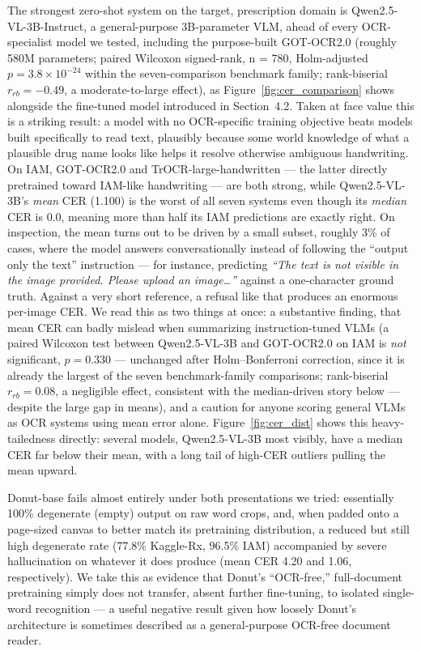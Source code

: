 \documentclass[12pt]{article}
\begin{document}
The strongest zero-shot system on the target, prescription domain is Qwen2.5-VL-3B-Instruct, a
general-purpose 3B-parameter VLM, ahead of every OCR-specialist model we tested, including the
purpose-built GOT-OCR2.0 (roughly 580M parameters; paired Wilcoxon signed-rank, n = 780, Holm-adjusted
$p = 3.8\times10^{-24}$ within the seven-comparison benchmark family; rank-biserial $r_{rb} = -0.49$, a
moderate-to-large effect), as Figure~\ref{fig:cer_comparison} shows alongside the
fine-tuned model introduced in Section~4.2. Taken at face value this is a striking result: a model
with no OCR-specific training objective beats models built specifically to read text, plausibly because
some world knowledge of what a plausible drug name looks like helps it resolve otherwise ambiguous
handwriting. On IAM, GOT-OCR2.0 and TrOCR-large-handwritten --- the latter directly pretrained toward
IAM-like handwriting --- are both strong, while Qwen2.5-VL-3B's \textit{mean} CER (1.100) is the worst of
all seven systems even though its \textit{median} CER is 0.0, meaning more than half its IAM predictions are
exactly right. On inspection, the mean turns out to be driven by a small subset, roughly 3\% of cases, where
the model answers conversationally instead of following the ``output only the text'' instruction --- for
instance, predicting \textit{``The text is not visible in the image provided. Please upload an
image\ldots''} against a one-character ground truth. Against a very short reference, a refusal like that
produces an enormous per-image CER. We read this as two things at once: a substantive finding, that mean
CER can badly mislead when summarizing instruction-tuned VLMs (a paired Wilcoxon test between Qwen2.5-VL-3B
and GOT-OCR2.0 on IAM is \textit{not} significant, $p = 0.330$ --- unchanged after Holm--Bonferroni
correction, since it is already the largest of the seven benchmark-family comparisons; rank-biserial
$r_{rb} = 0.08$, a negligible effect, consistent with the median-driven story below --- despite the large
gap in means), and a
caution for anyone scoring general VLMs as OCR systems using mean error alone. Figure~\ref{fig:cer_dist}
shows this heavy-tailedness directly: several models, Qwen2.5-VL-3B most visibly, have a median CER far
below their mean, with a long tail of high-CER outliers pulling the mean upward.

Donut-base fails almost entirely under both presentations we tried: essentially 100\% degenerate (empty)
output on raw word crops, and, when padded onto a page-sized canvas to better match its pretraining
distribution, a reduced but still high degenerate rate (77.8\% Kaggle-Rx, 96.5\% IAM) accompanied by severe
hallucination on whatever it does produce (mean CER 4.20 and 1.06, respectively). We take this as evidence
that Donut's ``OCR-free,'' full-document pretraining simply does not transfer, absent further fine-tuning,
to isolated single-word recognition --- a useful negative result given how loosely Donut's architecture is
sometimes described as a general-purpose OCR-free document reader.
\end{document}
